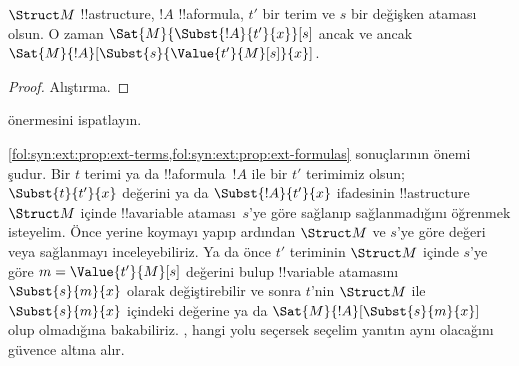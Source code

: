 \documentclass[../../../include/open-logic-section]{subfiles}
\begin{document}
\begin{prop} $\Struct M$ !!a{structure},
$!A$ !!a{formula}, $t'$ bir terim ve $s$ bir değişken ataması olsun.
O zaman $\Sat{M}{\Subst{!A}{t'}{x}}[s]$ ancak ve ancak
$\Sat{M}{!A}[\Subst{s}{\Value{t'}{M}[s]}{x}]$.
\end{prop}

\begin{proof}
Alıştırma.
\end{proof}

\begin{prob}
 önermesini ispatlayın.
\end{prob}

\begin{explain}
  \cref{fol:syn:ext:prop:ext-terms,fol:syn:ext:prop:ext-formulas}
  sonuçlarının önemi şudur. Bir $t$ terimi ya da !!a{formula}~$!A$ ile
  bir $t'$ terimimiz olsun; $\Subst{t}{t'}{x}$ değerini ya da
  $\Subst{!A}{t'}{x}$ ifadesinin !!a{structure}~$\Struct M$ içinde
  !!a{variable} ataması~$s$'ye göre sağlanıp sağlanmadığını öğrenmek
  isteyelim. Önce yerine koymayı yapıp ardından $\Struct M$ ve $s$'ye
  göre değeri veya sağlanmayı inceleyebiliriz. Ya da önce $t'$ teriminin
  $\Struct M$ içinde $s$'ye göre $m=\Value{t'}{M}[s]$ değerini bulup
  !!{variable} atamasını $\Subst{s}{m}{x}$ olarak değiştirebilir ve
  sonra $t$'nin $\Struct M$ ile $\Subst{s}{m}{x}$ içindeki değerine ya
  da $\Sat{M}{!A}[\Subst{s}{m}{x}]$ olup olmadığına bakabiliriz.
  ,
  hangi yolu seçersek seçelim yanıtın aynı olacağını güvence altına alır.
\end{explain}
\end{document}
